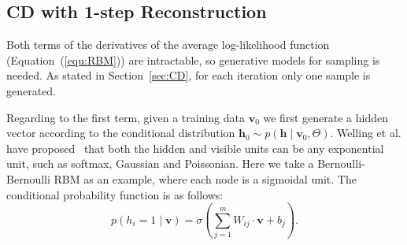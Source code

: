 \subsection{CD with 1-step Reconstruction}
\label{sec:cd}
	Both terms of the derivatives of the average log-likelihood function (Equation~(\ref{equ:RBM})) are intractable, so generative models for sampling is needed.
	As stated in Section~\ref{sec:CD}, for each iteration only one sample is generated.
	
	Regarding to the first term, given a training data $ \mathbf{v}_0 $ we first generate a hidden vector according to the conditional distribution $ \mathbf{h}_0 \sim p( \mathbf{h} \mid \mathbf{v}_0, \Theta) $.
	Welling et al. have proposed~\cite{welling2004exponential} that both the hidden and visible units can be any exponential unit, such as softmax, Gaussian and Poissonian.
	Here we take a Bernoulli-Bernoulli RBM as an example, where each node is a sigmoidal unit.
	The conditional probability function is as follows:
	\begin{equation}
		p(h_i = 1 \mid \mathbf{v}) = \sigma(\sum_{j=1}^{m} W_{ij} \cdot \mathbf{v} + b_j).
	\end{equation}
	
